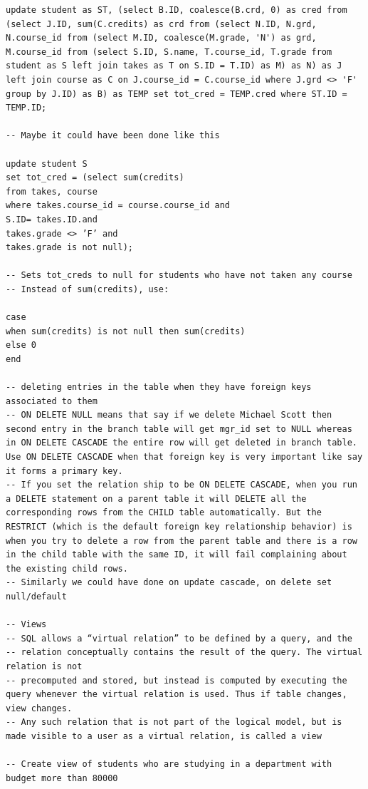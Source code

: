 \documentclass[8pt, a4paper, oneside, twocolumn]{extarticle}
\begin{document}
\begin{verbatim}
update student as ST, (select B.ID, coalesce(B.crd, 0) as cred from (select J.ID, sum(C.credits) as crd from (select N.ID, N.grd, N.course_id from (select M.ID, coalesce(M.grade, 'N') as grd, M.course_id from (select S.ID, S.name, T.course_id, T.grade from student as S left join takes as T on S.ID = T.ID) as M) as N) as J left join course as C on J.course_id = C.course_id where J.grd <> 'F' group by J.ID) as B) as TEMP set tot_cred = TEMP.cred where ST.ID = TEMP.ID;

-- Maybe it could have been done like this

update student S
set tot_cred = (select sum(credits)
from takes, course
where takes.course_id = course.course_id and
S.ID= takes.ID.and
takes.grade <> ’F’ and
takes.grade is not null);

-- Sets tot_creds to null for students who have not taken any course
-- Instead of sum(credits), use:

case
when sum(credits) is not null then sum(credits)
else 0
end

-- deleting entries in the table when they have foreign keys associated to them
-- ON DELETE NULL means that say if we delete Michael Scott then second entry in the branch table will get mgr_id set to NULL whereas in ON DELETE CASCADE the entire row will get deleted in branch table. Use ON DELETE CASCADE when that foreign key is very important like say it forms a primary key.
-- If you set the relation ship to be ON DELETE CASCADE, when you run a DELETE statement on a parent table it will DELETE all the corresponding rows from the CHILD table automatically. But the RESTRICT (which is the default foreign key relationship behavior) is when you try to delete a row from the parent table and there is a row in the child table with the same ID, it will fail complaining about the existing child rows.
-- Similarly we could have done on update cascade, on delete set null/default

-- Views
-- SQL allows a “virtual relation” to be defined by a query, and the
-- relation conceptually contains the result of the query. The virtual relation is not
-- precomputed and stored, but instead is computed by executing the query whenever the virtual relation is used. Thus if table changes, view changes.
-- Any such relation that is not part of the logical model, but is made visible to a user as a virtual relation, is called a view

-- Create view of students who are studying in a department with budget more than 80000


\end{verbatim}
\end{document}
